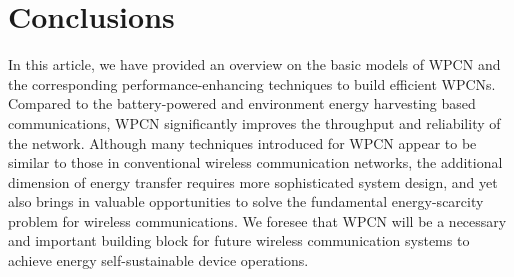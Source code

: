 \documentclass[journal, draftcls, one column, 12pt]{IEEEtran}
\begin{document}
\section{Conclusions}
In this article, we have provided an overview on the basic models of WPCN and the corresponding performance-enhancing techniques to build efficient WPCNs. Compared to the battery-powered and environment energy harvesting based communications, WPCN significantly improves the throughput and reliability of the network. Although many techniques introduced for WPCN appear to be similar to those in conventional wireless communication networks, the additional dimension of energy transfer requires more sophisticated system design, and yet also brings in valuable opportunities to solve the fundamental energy-scarcity problem for wireless communications. We foresee that WPCN will be a necessary and important building block for future wireless communication systems to achieve energy self-sustainable device operations.
\end{document}
